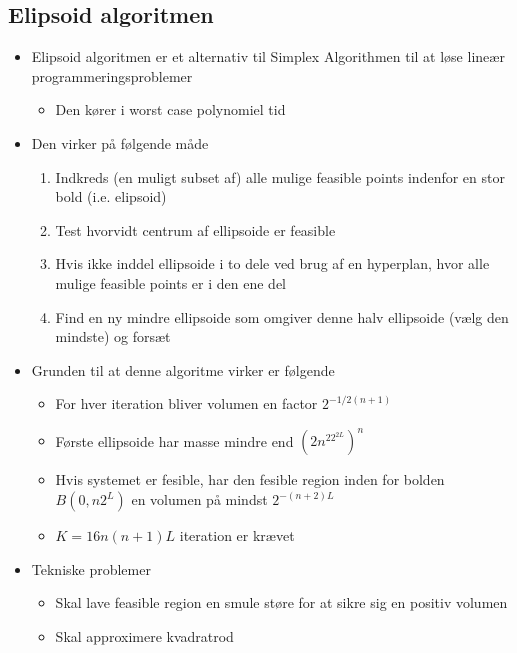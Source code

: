 \subsection{Elipsoid algoritmen}
\begin{itemize}
	\item Elipsoid algoritmen er et alternativ til Simplex Algorithmen til at løse lineær programmeringsproblemer  
  \begin{itemize}
  	\item Den kører i worst case polynomiel tid
  \end{itemize}
  \item Den virker på følgende måde
  \begin{enumerate}
  	\item Indkreds (en muligt subset af) alle mulige feasible points indenfor en stor bold (i.e. elipsoid)
    \item Test hvorvidt centrum af ellipsoide er feasible
    \item Hvis ikke inddel ellipsoide i to dele ved brug af en hyperplan, hvor alle mulige feasible points er i den ene del  
    \item Find en ny mindre ellipsoide som omgiver denne halv ellipsoide (vælg den mindste) og forsæt 
  \end{enumerate}
  \item Grunden til at denne algoritme virker er følgende
  \begin{itemize}
  	\item For hver iteration bliver volumen en factor $2^{-1/2(n+1)}$
    \item Første ellipsoide har masse mindre end $(2n^22^{2L})^n$ 
    \item Hvis systemet er fesible, har den fesible region inden for bolden $B(0,n2^L)$ en volumen på mindst $2^{-(n+2)L}$
    \item $K=16n(n+1)L$ iteration er krævet
  \end{itemize}
  \item Tekniske problemer
  \begin{itemize}
  	\item Skal lave feasible region en smule støre for at sikre sig en positiv volumen
    \item Skal approximere kvadratrod
  \end{itemize}
\end{itemize}

\newpage

